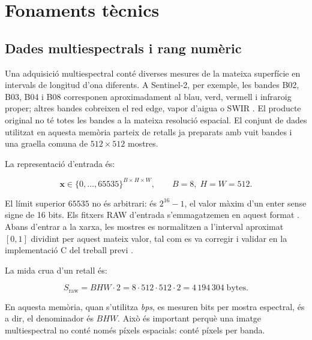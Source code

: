 \chapter{Fonaments tècnics}\label{ch:fonaments}
\fancyhead[LO]{\slshape \textsf{\nouppercase \rightmark}}

\section{Dades multiespectrals i rang numèric}\label{sec:dades_multi}

Una adquisició multiespectral conté diverses mesures de la mateixa superfície
en intervals de longitud d'ona diferents. A Sentinel-2, per exemple, les bandes
B02, B03, B04 i B08 corresponen aproximadament al blau, verd, vermell i
infraroig proper; altres bandes cobreixen el red edge, vapor d'aigua o SWIR
\cite{esa2015sentinel2}. El producte original no té totes les bandes a la
mateixa resolució espacial. El conjunt de dades utilitzat en aquesta memòria
parteix de retalls ja preparats amb vuit bandes i una graella comuna de
$512\times512$ mostres.

La representació d'entrada és:

\begin{equation}
\mathbf{x}\in\{0,\ldots,65535\}^{B\times H\times W},
\qquad B=8,\;H=W=512.
\label{eq:input_tensor}
\end{equation}

El límit superior $65535$ no és arbitrari: és $2^{16}-1$, el valor màxim d'un
enter sense signe de 16 bits. Els fitxers RAW d'entrada s'emmagatzemen en aquest
format . Abans d'entrar a la xarxa, les mostres es normalitzen a
l'interval aproximat $[0,1]$ dividint per aquest mateix valor, tal com es va
corregir i validar en la implementació C del treball previ
\cite{anez2026treball}.

La mida crua d'un retall és:

\begin{equation}
S_{\mathrm{raw}}=BHW\cdot2
=8\cdot512\cdot512\cdot2
=4\,194\,304\;\mathrm{bytes}.
\label{eq:raw_size}
\end{equation}

En aquesta memòria, quan s'utilitza \emph{bps}, es mesuren bits per mostra
espectral, és a dir, el denominador és $BHW$. Això és important perquè una
imatge multiespectral no conté només píxels espacials: conté píxels per banda.

